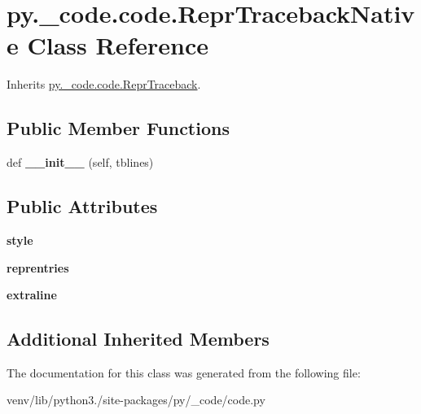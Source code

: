 \hypertarget{classpy_1_1__code_1_1code_1_1_repr_traceback_native}{}\section{py.\+\_\+code.\+code.\+Repr\+Traceback\+Native Class Reference}
\label{classpy_1_1__code_1_1code_1_1_repr_traceback_native}


Inherits \hyperlink{classpy_1_1__code_1_1code_1_1_repr_traceback}{py.\+\_\+code.\+code.\+Repr\+Traceback}.

\subsection*{Public Member Functions}
\begin{DoxyCompactItemize}
\item 
\mbox{\label{classpy_1_1__code_1_1code_1_1_repr_traceback_native_a84f00293477d12ba6807d121365ccddf}} 
def {\bfseries \+\_\+\+\_\+init\+\_\+\+\_\+} (self, tblines)
\end{DoxyCompactItemize}
\subsection*{Public Attributes}
\begin{DoxyCompactItemize}
\item 
\mbox{\label{classpy_1_1__code_1_1code_1_1_repr_traceback_native_a208aecebbb6d7cc451e24a135886d672}} 
{\bfseries style}
\item 
\mbox{\label{classpy_1_1__code_1_1code_1_1_repr_traceback_native_a926c3e3d9eaf33bc46094706b0c3bffd}} 
{\bfseries reprentries}
\item 
\mbox{\label{classpy_1_1__code_1_1code_1_1_repr_traceback_native_a8599626b9ef310e115973edc04dd6b02}} 
{\bfseries extraline}
\end{DoxyCompactItemize}
\subsection*{Additional Inherited Members}


The documentation for this class was generated from the following file\+:\begin{DoxyCompactItemize}
\item 
venv/lib/python3./site-\/packages/py/\+\_\+code/code.\+py\end{DoxyCompactItemize}
